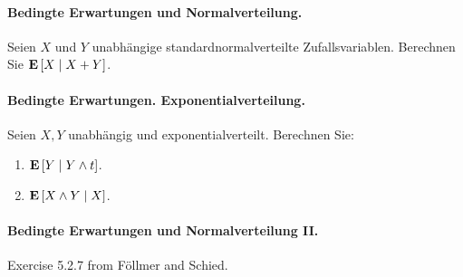 \paragraph{Bedingte Erwartungen und Normalverteilung.} Seien $X$ und $Y$ unabhängige
standardnormalverteilte Zufallsvariablen. Berechnen Sie $\mathbf{E}\left[ X \;\middle\vert\; X+Y
\right]$.


\paragraph{Bedingte Erwartungen. Exponentialverteilung.} Seien $X,Y$ unabhängig
und exponentialverteilt. Berechnen Sie:
\begin{enumerate}
    \item $\mathbf{E}\left[ Y \;\middle\vert\; Y \wedge t \right]$.
    \item $\mathbf{E} \left[ X \wedge Y \;\middle\vert\; X \right]$.
\end{enumerate}


\paragraph{Bedingte Erwartungen und Normalverteilung II.} Exercise 5.2.7 from
Föllmer and Schied.



